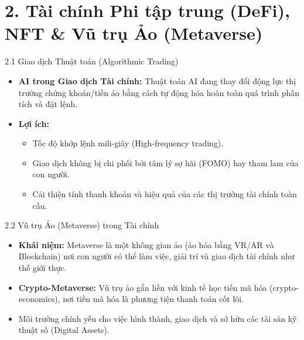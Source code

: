 \documentclass[aspectratio=169]{beamer}
\begin{document}
\section{2. Tài chính Phi tập trung (DeFi), NFT \& Vũ trụ Ảo (Metaverse)}

\begin{frame}{2.1 Giao dịch Thuật toán (Algorithmic Trading)}
    \begin{itemize}
        \item \textbf{AI trong Giao dịch Tài chính:} Thuật toán AI đang thay đổi động lực thị trường chứng khoán/tiền ảo bằng cách tự động hóa hoàn toàn quá trình phân tích và đặt lệnh.
        \item \textbf{Lợi ích:}
        \begin{itemize}
            \item Tốc độ khớp lệnh mili-giây (High-frequency trading).
            \item Giao dịch không bị chi phối bởi tâm lý sợ hãi (FOMO) hay tham lam của con người.
            \item Cải thiện tính thanh khoản và hiệu quả của các thị trường tài chính toàn cầu.
        \end{itemize}
    \end{itemize}
\end{frame}

\begin{frame}{2.2 Vũ trụ Ảo (Metaverse) trong Tài chính}
    \begin{itemize}
        \item \textbf{Khái niệm:} Metaverse là một không gian ảo (ảo hóa bằng VR/AR và Blockchain) nơi con người có thể làm việc, giải trí và giao dịch tài chính như thế giới thực.
        \item \textbf{Crypto-Metaverse:} Vũ trụ ảo gắn liền với kinh tế học tiền mã hóa (crypto-economics), nơi tiền mã hóa là phương tiện thanh toán cốt lõi.
        \item Môi trường chính yếu cho việc hình thành, giao dịch và sở hữu các tài sản kỹ thuật số (Digital Assets).
    \end{itemize}
\end{frame}
\end{document}
